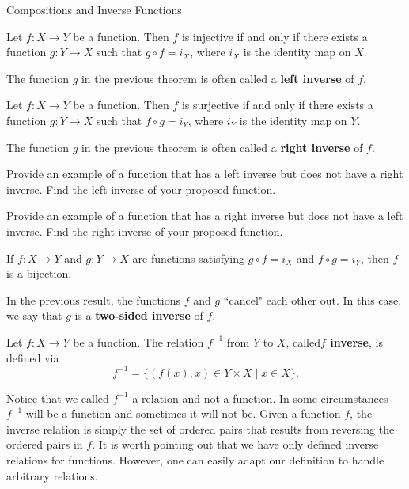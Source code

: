 \begin{section}{Compositions and Inverse Functions}
\begin{theorem}
Let $f:X\to Y$ be a function. Then $f$ is injective if and only if there exists a function $g:Y\to X$ such that $g\circ f=i_X$, where $i_X$ is the identity map on $X$.
\end{theorem}

The function $g$ in the previous theorem is often called a \textbf{left inverse} of $f$.

\begin{theorem}
Let $f:X\to Y$ be a function. Then $f$ is surjective if and only if there exists a function $g:Y\to X$ such that $f\circ g=i_Y$, where $i_Y$ is the identity map on $Y$.
\end{theorem}

The function $g$ in the previous theorem is often called a \textbf{right inverse} of $f$.

\begin{problem}
Provide an example of a function that has a left inverse but does not have a right inverse. Find the left inverse of your proposed function.
\end{problem}

\begin{problem}
Provide an example of a function that has a right inverse but does not have a left inverse. Find the right inverse of your proposed function.
\end{problem}

\begin{corollary}\label{cor:two-sided inverse}
If $f:X\to Y$ and $g:Y\to X$ are functions satisfying $g\circ f=i_X$ and  $f\circ g=i_Y$, then $f$ is a bijection.
\end{corollary}

In the previous result, the functions $f$ and $g$ ``cancel" each other out. In this case, we say that $g$ is a \textbf{two-sided inverse} of $f$.

\begin{definition}\label{def:inverse of a function}
Let $f:X\to Y$ be a function.  The relation $f^{-1}$ from $Y$ to $X$, called\textbf{$f$ inverse}, is defined via
\[
\boxed{f^{-1}=\{(f(x),x)\in Y\times X\mid x\in X\}}.
\] 
\end{definition}

Notice that we called $f^{-1}$ a relation and not a function.  In some circumstances $f^{-1}$ will be a function and sometimes it will not be. Given a function $f$, the inverse relation is simply the set of ordered pairs that results from reversing the ordered pairs in $f$.  It is worth pointing out that we have only defined inverse relations for functions.  However, one can easily adapt our definition to handle arbitrary relations.


\end{section}
